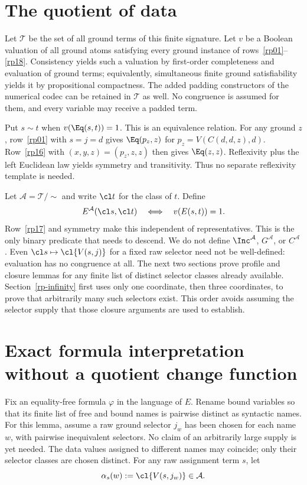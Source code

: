 \section{The quotient of data}

Let $\mathcal T$ be the set of all ground terms of this finite signature.
Let $v$ be a Boolean valuation of all ground atoms satisfying every
ground instance of rows~\ref{rp01}--\ref{rp18}. Consistency yields such
a valuation by first-order completeness and evaluation of ground terms;
equivalently, simultaneous finite ground satisfiability yields it by
propositional compactness. The added padding constructors of the numerical
codec can be retained in $\mathcal T$ as well. No congruence is assumed
for them, and every variable may receive a padded term.

Put $s\sim t$ when $v(\Eq(s,t))=1$. This is an equivalence relation.
For any ground $z$, row~\ref{rp01} with $s=j=d$ gives
$\Eq(p_z,z)$ for $p_z=V(C(d,d,z),d)$. Row~\ref{rp16} with
$(x,y,z)=(p_z,z,z)$ then gives $\Eq(z,z)$. Reflexivity plus the left
Euclidean law yields symmetry and transitivity. Thus no separate
reflexivity template is needed.

Let $\mathcal A=\mathcal T/{\sim}$ and write $\cl t$ for the class
of $t$. Define
\[
 E^{\mathcal A}(\cl s,\cl t)\quad\Longleftrightarrow\quad v(E(s,t))=1.
\]
Row~\ref{rp17} and symmetry make this independent of representatives.
This is the only binary predicate that needs to descend. We do not define
$\Inc^{\mathcal A}$, $G^{\mathcal A}$, or $C^{\mathcal A}$.
Even $\cl s\mapsto\cl{V(s,j)}$ for a fixed raw selector need not be
well-defined: evaluation has no congruence at all. The next two sections
prove profile and closure lemmas for any finite list of distinct selector
classes already available. Section~\ref{rp-infinity} first uses only
one coordinate, then three coordinates, to prove that arbitrarily many
such selectors exist. This order avoids assuming the selector supply
that those closure arguments are used to establish.

\section{Exact formula interpretation without a quotient change function}

Fix an equality-free formula $\varphi$ in the language of $E$. Rename
bound variables so that its finite list of free and bound names is
pairwise distinct as syntactic names. For this lemma, assume a raw ground
selector $j_w$ has been chosen for each name $w$, with pairwise
inequivalent selectors. No claim of an arbitrarily large supply is yet
needed. The data values
assigned to different names may coincide; only their selector classes
are chosen distinct. For any raw assignment term $s$, let
\[
 \alpha_s(w):=\cl{V(s,j_w)}\in\mathcal A.
\]

